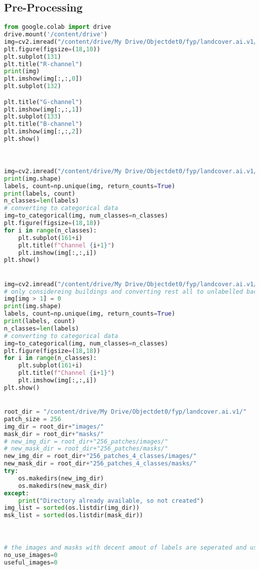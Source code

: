 \subsection{Pre-Processing}
\begin{lstlisting}[language=Python]
from google.colab import drive
drive.mount('/content/drive')
img=cv2.imread("/content/drive/My Drive/Objectdet0/fyp/landcover.ai.v1/images/N-33-60-D-c-4-2.tif")
plt.figure(figsize=(18,10))
plt.subplot(131)
plt.title("R-channel")
print(img)
plt.imshow(img[:,:,0])
plt.subplot(132)

plt.title("G-channel")
plt.imshow(img[:,:,1])
plt.subplot(133)
plt.title("B-channel")
plt.imshow(img[:,:,2])
plt.show()



img=cv2.imread("/content/drive/My Drive/Objectdet0/fyp/landcover.ai.v1/masks/N-33-60-D-c-4-2.tif",0)
print(img.shape)
labels, count=np.unique(img, return_counts=True)
print(labels, count)
n_classes=len(labels)
# converting to categorical data
img=to_categorical(img, num_classes=n_classes)
plt.figure(figsize=(18,18))
for i in range(n_classes):
    plt.subplot(161+i)
    plt.title(f"Channel {i+1}")
    plt.imshow(img[:,:,i])
plt.show()


img=cv2.imread("/content/drive/My Drive/Objectdet0/fyp/landcover.ai.v1/masks/N-33-60-D-c-4-2.tif",0)
# only considereing buildings and converting rest all to unlabelled background
img[img > 1] = 0
print(img.shape)
labels, count=np.unique(img, return_counts=True)
print(labels, count)
n_classes=len(labels)
# converting to categorical data
img=to_categorical(img, num_classes=n_classes)
plt.figure(figsize=(18,18))
for i in range(n_classes):
    plt.subplot(161+i)
    plt.title(f"Channel {i+1}")
    plt.imshow(img[:,:,i])
plt.show()


root_dir = "/content/drive/My Drive/Objectdet0/fyp/landcover.ai.v1/"
patch_size = 256
img_dir = root_dir+"images/"
mask_dir = root_dir+"masks/"
# new_img_dir = root_dir+"256_patches/images/"
# new_mask_dir = root_dir+"256_patches/masks/"
new_img_dir = root_dir+"256_patches_4_classes/images/"
new_mask_dir = root_dir+"256_patches_4_classes/masks/"
try:
    os.makedirs(new_img_dir)
    os.makedirs(new_mask_dir)
except:
    print("Directory already available, so not created")
img_list = sorted(os.listdir(img_dir))
msk_list = sorted(os.listdir(mask_dir))



# the images and masks with decent amout of labels are seperated and used for training.
no_use_images=0
useful_images=0


\end{lstlisting}
